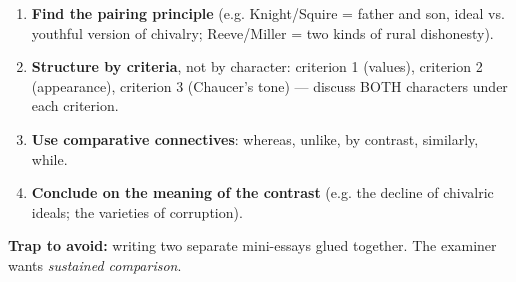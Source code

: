 \documentclass[11pt]{article}
\begin{document}
\begin{methode}
\begin{enumerate}
\item \textbf{Find the pairing principle} (e.g. Knight/Squire = father and son, ideal vs. youthful version of chivalry; Reeve/Miller = two kinds of rural dishonesty).
\item \textbf{Structure by criteria}, not by character: criterion 1 (values), criterion 2 (appearance), criterion 3 (Chaucer's tone) — discuss BOTH characters under each criterion.
\item \textbf{Use comparative connectives}: whereas, unlike, by contrast, similarly, while.
\item \textbf{Conclude on the meaning of the contrast} (e.g. the decline of chivalric ideals; the varieties of corruption).
\end{enumerate}
\textbf{Trap to avoid:} writing two separate mini-essays glued together. The examiner wants \emph{sustained comparison}.
\end{methode}
\end{document}
